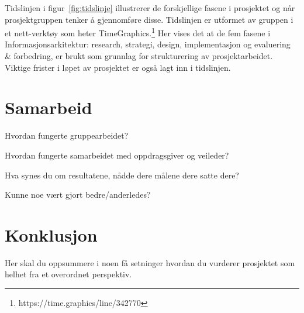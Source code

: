 \documentclass[11pt,a4paper]{report}
\begin{document}
Tidslinjen i figur~\ref{fig:tidslinje} illustrerer de forskjellige fasene i prosjektet og når prosjektgruppen tenker å gjennomføre disse. Tidslinjen er utformet av gruppen i et nett-verktøy som heter TimeGraphics.\footnote{https://time.graphics/line/342770} Her vises det at de fem fasene i Informasjonsarkitektur: research, strategi, design, implementasjon og evaluering \& forbedring, er brukt som grunnlag for strukturering av prosjektarbeidet. Viktige frister i løpet av prosjektet er også lagt inn i tidslinjen.


\section*{Samarbeid}

Hvordan fungerte gruppearbeidet?

Hvordan fungerte samarbeidet med oppdragsgiver og veileder?
    
Hva synes du om resultatene, nådde dere målene dere satte dere?

Kunne noe vært gjort bedre/anderledes? 

\section*{Konklusjon}

Her skal du oppsummere i noen få setninger hvordan du vurderer prosjektet som helhet fra et overordnet perspektiv.
\end{document}

